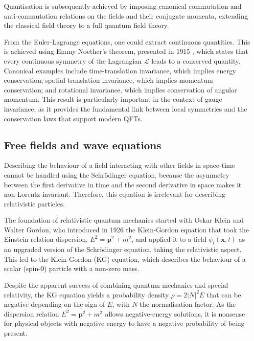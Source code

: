 Quantisation is subsequently achieved by imposing canonical commutation and anti-commutation relations on the fields and their conjugate momenta, extending the classical field theory to a full quantum field theory.

\vspace{0.5 cm}

From the Euler-Lagrange equations, one could extract continuous quantities. This is achieved using Emmy Noether's theorem, presented in 1915 \cite{Noether1918}, which states that every continuous symmetry of the Lagrangian $\mathcal{L}$ leads to a conserved quantity. Canonical examples include time-translation invariance, which implies energy conservation; spatial-translation invariance, which implies momentum conservation; and rotational invariance, which implies conservation of angular momentum. This result is particularly important in the context of gauge invariance, as it provides the fundamental link between local symmetries and the conservation laws that support modern QFTs.


\subsection{Free fields and wave equations}

Describing the behaviour of a field interacting with other fields in space-time cannot be handled using the Schrödinger equation, because the asymmetry between the first derivative in time and the second derivative in space makes it non-Lorentz-invariant. Therefore, this equation is irrelevant for describing relativistic particles.

\vspace{0.5 cm}

The foundation of relativistic quantum mechanics started with Oskar Klein and Walter Gordon, who introduced in 1926 the Klein-Gordon equation that took the Einstein relation dispersion, $E^2 = \mathbf{p}^2+m^2$, and applied it to a field $\phi_i(\textbf{x},t)$ as an upgraded version of the Schrödinger equation, taking the relativistic aspect. This led to the Klein-Gordon (KG) equation, which describes the behaviour of a scalar (spin-0) particle with a non-zero mass. 

Despite the apparent success of combining quantum mechanics and special relativity, the KG equation yields a probability density $\rho=2|N|^2E$ that can be negative depending on the sign of $E$, with $N$ the normalisation factor. As the dispersion relation $E^2 = \mathbf{p}^2+m^2$ allows negative-energy solutions, it is nonsense for physical objects with negative energy to have a negative probability of being present.

